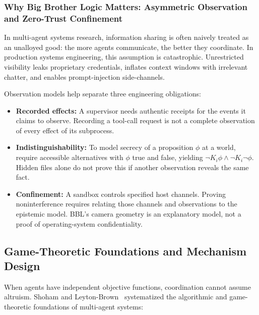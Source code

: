 \subsubsection{Why Big Brother Logic Matters: Asymmetric Observation and Zero-Trust Confinement}
\label{sec:why-bbl-matters}

In multi-agent systems research, information sharing is often naively treated as an unalloyed good: the more agents communicate, the better they coordinate. In production systems engineering, this assumption is catastrophic. Unrestricted visibility leaks proprietary credentials, inflates context windows with irrelevant chatter, and enables prompt-injection side-channels.

Observation models help separate three engineering obligations:
\begin{itemize}[leftmargin=1.8em,itemsep=2pt]
  \item \textbf{Recorded effects:} A supervisor needs authentic receipts for the events it claims to observe. Recording a tool-call request is not a complete observation of every effect of its subprocess.
  \item \textbf{Indistinguishability:} To model secrecy of a proposition $\phi$ at a world, require accessible alternatives with $\phi$ true and false, yielding $\neg K_i\phi\land\neg K_i\neg\phi$. Hidden files alone do not prove this if another observation reveals the same fact.
  \item \textbf{Confinement:} A sandbox controls specified host channels. Proving noninterference requires relating those channels and observations to the epistemic model. BBL's camera geometry is an explanatory model, not a proof of operating-system confidentiality.
\end{itemize}

\subsection{Game-Theoretic Foundations and Mechanism Design}

When agents have independent objective functions, coordination cannot assume altruism. Shoham and Leyton-Brown~ systematized the algorithmic and game-theoretic foundations of multi-agent systems:

